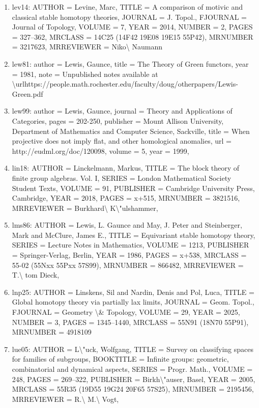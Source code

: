 \documentclass[11pt]{article}
\begin{document}
\begin{enumerate}[leftmargin=*]
  \item lev14: AUTHOR = Levine, Marc, TITLE = A comparison of motivic and classical stable homotopy theories, JOURNAL = J. Topol., FJOURNAL = Journal of Topology, VOLUME = 7, YEAR = 2014, NUMBER = 2, PAGES = 327--362, MRCLASS = 14C25 (14F42 19E08 19E15 55P42), MRNUMBER = 3217623, MRREVIEWER = Niko\textbackslash{} Naumann
  \item lew81: author = Lewis, Gaunce, title = The Theory of Green functors, year = 1981, note = Unpublished notes available at \textbackslash{}urlhttps://people.math.rochester.edu/faculty/doug/otherpapers/Lewis-Green.pdf
  \item lew99: author = Lewis, Gaunce, journal = Theory and Applications of Categories, pages = 202-250, publisher = Mount Allison University, Department of Mathematics and Computer Science, Sackville, title = When projective does not imply flat, and other homological anomalies, url = http://eudml.org/doc/120098, volume = 5, year = 1999,
  \item lin18: AUTHOR = Linckelmann, Markus, TITLE = The block theory of finite group algebras. Vol. I, SERIES = London Mathematical Society Student Texts, VOLUME = 91, PUBLISHER = Cambridge University Press, Cambridge, YEAR = 2018, PAGES = x+515, MRNUMBER = 3821516, MRREVIEWER = Burkhard\textbackslash{} K\textbackslash{}"ulshammer,
  \item lms86: AUTHOR = Lewis, L. Gaunce and May, J. Peter and Steinberger, Mark and McClure, James E., TITLE = Equivariant stable homotopy theory, SERIES = Lecture Notes in Mathematics, VOLUME = 1213, PUBLISHER = Springer-Verlag, Berlin, YEAR = 1986, PAGES = x+538, MRCLASS = 55-02 (55Nxx 55Pxx 57S99), MRNUMBER = 866482, MRREVIEWER = T.\textbackslash{} tom Dieck,
  \item lnp25: AUTHOR = Linskens, Sil and Nardin, Denis and Pol, Luca, TITLE = Global homotopy theory via partially lax limits, JOURNAL = Geom. Topol., FJOURNAL = Geometry \textbackslash{}\& Topology, VOLUME = 29, YEAR = 2025, NUMBER = 3, PAGES = 1345--1440, MRCLASS = 55N91 (18N70 55P91), MRNUMBER = 4918109
  \item lue05: AUTHOR = L\textbackslash{}"uck, Wolfgang, TITLE = Survey on classifying spaces for families of subgroups, BOOKTITLE = Infinite groups: geometric, combinatorial and dynamical aspects, SERIES = Progr. Math., VOLUME = 248, PAGES = 269--322, PUBLISHER = Birkh\textbackslash{}"auser, Basel, YEAR = 2005, MRCLASS = 55R35 (19D55 19G24 20F65 57S25), MRNUMBER = 2195456, MRREVIEWER = R.\textbackslash{} M.\textbackslash{} Vogt,

\end{enumerate}
\end{document}
